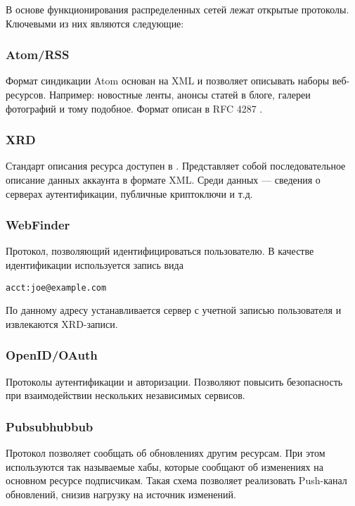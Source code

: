 \documentclass[10pt, a5paper]{article}
\begin{document}
 В основе функционирования распределенных сетей лежат открытые протоколы.
 Ключевыми из них являются следующие:

 \subsubsection*{Atom/RSS}

    Формат синдикации Atom основан на XML и позволяет описывать наборы
    веб-ресурсов. Например: новостные ленты, анонсы статей в блоге,
    галереи фотографий и тому подобное. Формат описан в RFC 4287 \cite{zag2}.

    \subsubsection*{XRD}
 Стандарт описания ресурса доступен в \cite{zag3}. Представляет собой
    последовательное описание данных аккаунта в формате XML. Среди
    данных --- сведения о серверах аутентификации, публичные криптоключи и т.д.

    \subsubsection*{WebFinder}
    Протокол, позволяющий идентифицироваться пользователю. В качестве
    идентификации используется запись вида 
    
    \verb!acct:joe@example.com!

    По данному адресу устанавливается сервер с учетной записью
    пользователя и извлекаются XRD-записи.

 \subsubsection*{OpenID/OAuth}
    Протоколы аутентификации и авторизации. Позволяют повысить
    безопасность при взаимодействии нескольких независимых сервисов.

    \subsubsection*{Pubsubhubbub}
    Протокол позволяет сообщать об обновлениях другим ресурсам. При этом
    используются так называемые хабы, которые сообщают об изменениях на
    основном ресурсе подписчикам. Такая схема позволяет реализовать 
    Push-канал обновлений, снизив нагрузку на источник изменений.
\end{document}
